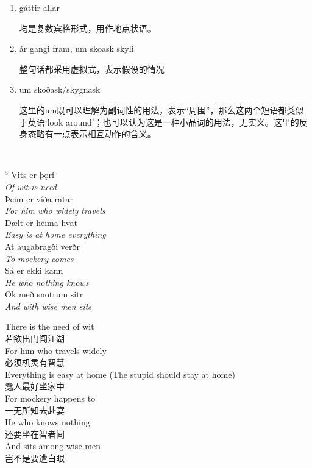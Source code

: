 \begin{grammar*}{}
    \begin{enumerate}[leftmargin=*]
        \item gáttir allar

              均是复数宾格形式，用作地点状语。

        \item \'a\dh r gangi fram, um sko\dh ask skyli

              整句话都采用虚拟式，表示假设的情况

        \item um skoðask/skygnask

              这里的um既可以理解为副词性的用法，表示“周围”，那么这两个短语都类似于英语`look around'；也可以认为这是一种小品词的用法，无实义。这里的反身态略有一点表示相互动作的含义。

    \end{enumerate}
\end{grammar*}
\hspace*{\fill}\\ %
\begin{paracol}{2}
    \noindent
    $^5$ Vits er þǫrf\\
    \textit{Of wit is need}\\
    \MakeUppercase þeim er víða ratar\\
    \textit{For him who widely travels}\\
    Dælt er heima hvat\\
    \textit{Easy is at home everything}\\
    At augabragði verðr\\
    \textit{To mockery comes}\\
    Sá er ekki kann \\
    \textit{He who nothing knows}\\
    Ok með snotrum sitr\\
    \textit{And with wise men sits}\\

    \switchcolumn

    \noindent
    There is the need of wit\\
    若欲出门闯江湖\\
    For him who travels widely\\
    必须机灵有智慧\\
    Everything is easy at home (The stupid should stay at home)\\
    蠢人最好坐家中\\
    For mockery happens to\\
    一无所知去赴宴\\
    He who knows nothing\\
    还要坐在智者间\\
    And sits among wise men\\
    岂不是要遭白眼\\
\end{paracol}
